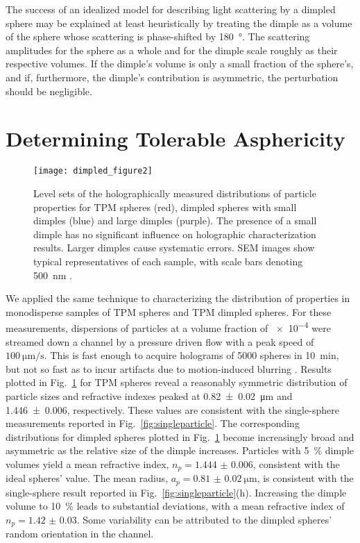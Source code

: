The success of an idealized model for describing light scattering by a
dimpled sphere may be explained at least heuristically by treating
the dimple as a volume of the sphere whose scattering is phase-shifted
by \SI{180}{\degree}.
The scattering amplitudes for the sphere as a whole and for the dimple
scale roughly as their respective volumes.
If the dimple's volume is only a small fraction of the
sphere's, and if, furthermore, the dimple's contribution is asymmetric,
the perturbation should be negligible.


\section{Determining Tolerable Asphericity}


\begin{figure}[!t]
  \centering
  \texttt{[image: dimpled\_figure2]}
  \caption{Level sets of the holographically measured 
    distributions of particle properties for TPM spheres
    (red), dimpled spheres with small dimples (blue) and
    large dimples (purple).  The presence of a small dimple
    has no significant influence on holographic characterization
    results.  Larger dimples cause systematic errors.
    SEM images show typical representatives of each sample,
    with scale bars denoting \SI{500}{\nm} \cite{hannel15}.}
  \label{fig:distributions}
\end{figure}

We applied the same technique to characterizing the distribution
of properties in monodisperse samples of TPM spheres and 
TPM dimpled spheres.
For these measurements, dispersions of particles at a volume fraction
of \num{e-4} were streamed down a channel by a pressure driven flow
with a peak speed of $\SI{100}{\um\per\second}$.  This is fast enough
to acquire holograms of \num{5000} spheres in \SI{10}{\minute}, but
not so fast as to incur artifacts due to motion-induced blurring
\cite{cheong09,dixon11}.
Results plotted in Fig.~\ref{fig:distributions} for TPM spheres reveal
a reasonably symmetric distribution of particle sizes and refractive
indexes peaked at \SI{0.82(2)}{\um} and \num{1.446(6)}, respectively.
These values are consistent with the single-sphere measurements
reported in Fig.~\ref{fig:singleparticle}.
The corresponding distributions for dimpled spheres plotted in
Fig.~\ref{fig:distributions} become increasingly broad and asymmetric
as the relative size of the dimple increases.
Particles with \SI{5}{\percent} dimple volumes yield a mean refractive
index, $n_p=\num{1.444(6)}$, consistent with the ideal spheres' value.
The mean radius, $a_p=\SI{0.81(2)}{\um}$, is consistent with the
  single-sphere result reported in Fig.~\ref{fig:singleparticle}(h).
Increasing the dimple volume to \SI{10}{\percent} leads to
substantial deviations, with a mean refractive index of
$n_p=\num{1.42(3)}$.
Some variability can be attributed to the dimpled spheres'
random orientation in the channel.

